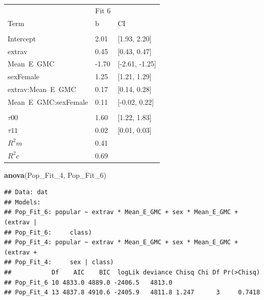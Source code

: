 \documentclass[]{article}
\newenvironment{Shaded}{\begin{snugshade}}{\end{snugshade}}
\newcommand{\KeywordTok}[1]{\textcolor[rgb]{0.13,0.29,0.53}{\textbf{#1}}}
\newcommand{\DecValTok}[1]{\textcolor[rgb]{0.00,0.00,0.81}{#1}}
\newcommand{\NormalTok}[1]{#1}
\begin{document}
\begin{tabular}{lll}
\toprule
\multicolumn{1}{c}{ } & \multicolumn{1}{c}{Fit 6} \\
\cmidrule(l{2pt}r{2pt}){2-2}
Term & b & CI\\
\midrule
\addlinespace[0.3em]
\multicolumn{3}{l}{\textbf{Fixed}}\\
\hspace{1em}Intercept & 2.01 & [1.93, 2.20]\\
\hspace{1em}extrav & 0.45 & [0.43, 0.47]\\
\hspace{1em}Mean\ E\ GMC & -1.70 & [-2.61, -1.25]\\
\hspace{1em}sexFemale & 1.25 & [1.21, 1.29]\\
\hspace{1em}extrav:Mean\ E\ GMC & 0.17 & [0.14, 0.28]\\
\hspace{1em}Mean\ E\ GMC:sexFemale & 0.11 & [-0.02, 0.22]\\
\addlinespace[0.3em]
\multicolumn{3}{l}{\textbf{Random}}\\
\hspace{1em}$\tau {00}$ & 1.60 & [1.22, 1.83]\\
\hspace{1em}$\tau {11}$ & 0.02 & [0.01, 0.03]\\
$R^2 m$ & 0.41 & \\
$R^2 c$ & 0.69 & \\
\bottomrule
\end{tabular}

\begin{Shaded}
\begin{Highlighting}[]
\KeywordTok{anova}\NormalTok{(Pop_Fit_}\DecValTok{4}\NormalTok{, Pop_Fit_}\DecValTok{6}\NormalTok{)}
\end{Highlighting}
\end{Shaded}

\begin{verbatim}
## Data: dat
## Models:
## Pop_Fit_6: popular ~ extrav * Mean_E_GMC + sex * Mean_E_GMC + (extrav | 
## Pop_Fit_6:     class)
## Pop_Fit_4: popular ~ extrav * Mean_E_GMC + sex * Mean_E_GMC + (extrav + 
## Pop_Fit_4:     sex | class)
##           Df    AIC    BIC  logLik deviance Chisq Chi Df Pr(>Chisq)
## Pop_Fit_6 10 4833.0 4889.0 -2406.5   4813.0                        
## Pop_Fit_4 13 4837.8 4910.6 -2405.9   4811.8 1.247      3     0.7418
\end{verbatim}
\end{document}
